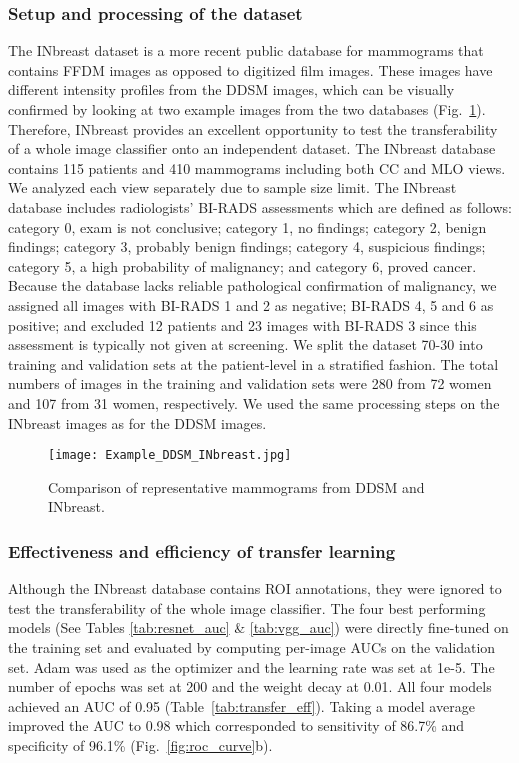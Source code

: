 \documentclass[12pt,letterpaper]{article}
\begin{document}
\subsubsection{Setup and processing of the dataset}
The INbreast \cite{moreira_inbreast_2012} dataset is a more recent public database for mammograms that contains FFDM images as opposed to digitized film images. These images have different intensity profiles from the DDSM images, which can be visually confirmed by looking at two example images from the two databases (Fig.~\ref{fig:ddsm_vs_inbr}). Therefore, INbreast provides an excellent opportunity to test the transferability of a whole image classifier onto an independent dataset. The INbreast database contains 115 patients and 410 mammograms including both CC and MLO views. We analyzed each view separately due to sample size limit. The INbreast database includes radiologists' BI-RADS \cite{dorsi_acr_2013} assessments which are defined as follows: category 0, exam is not conclusive; category 1, no findings; category 2, benign findings; category 3, probably benign findings; category 4, suspicious findings; category 5, a high probability of malignancy; and category 6, proved cancer. Because the database lacks reliable pathological confirmation of malignancy, we assigned all images with BI-RADS 1 and 2 as negative; BI-RADS 4, 5 and 6 as positive; and excluded 12 patients and 23 images with BI-RADS 3 since this assessment is typically not given at screening. We split the dataset 70-30 into training and validation sets at the patient-level in a stratified fashion. The total numbers of images in the training and validation sets were 280 from 72 women and 107 from 31 women, respectively. We used the same processing steps on the INbreast images as for the DDSM images. 


\begin{figure}
  \centering
  \texttt{[image: Example\_DDSM\_INbreast.jpg]}
  \caption{Comparison of representative mammograms from DDSM and INbreast.}
  \label{fig:ddsm_vs_inbr}
\end{figure}


\subsubsection{Effectiveness and efficiency of transfer learning}
Although the INbreast database contains ROI annotations, they were ignored to test the transferability of the whole image classifier. The four best performing models (See Tables \ref{tab:resnet_auc} \& \ref{tab:vgg_auc}) were directly fine-tuned on the training set and evaluated by computing per-image AUCs on the validation set. Adam \cite{kingma_adam_2014} was used as the optimizer and the learning rate was set at 1e-5. The number of epochs was set at 200 and the weight decay at 0.01. All four models achieved an AUC of 0.95 (Table~\ref{tab:transfer_eff}). Taking a model average improved the AUC to 0.98 which corresponded to sensitivity of 86.7\% and specificity of 96.1\% (Fig.~\ref{fig:roc_curve}b). 
\end{document}
